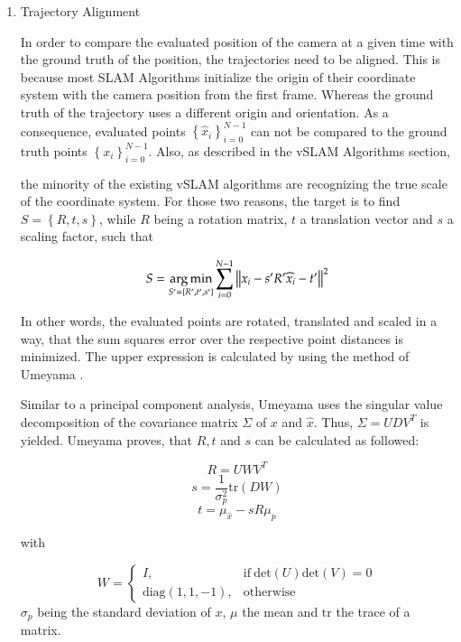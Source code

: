 	\begin{enumerate}
	\item{Trajectory Alignment}\label{umeyamesec}
	
	In order to compare the evaluated position of the camera at a given time with the ground truth of the 
	position, the trajectories need to be aligned. This is because most SLAM Algorithms initialize the origin
	of their coordinate system with the camera position from the first frame. Whereas the ground truth of the 
	trajectory uses a different origin and orientation. As a consequence, evaluated points $ \left\{{\widehat{x}_i}\right\}_{i=0}^{N-1}$ can not be 
	compared to the ground truth points $\left\{{x_i}\right\}_{i=0}^{N-1}$.
	Also, as described in the vSLAM Algorithms section,
	
	
	the minority of the existing vSLAM algorithms are recognizing the true scale of the coordinate system. For
	those two reasons, the target is to find $S = \left\{R,t,s\right\}$, while $R$ being a rotation matrix, $t$ a translation vector
	and $s$ a scaling factor, 
	such that
	
	\begin{equation}
	S = \mathop{\mathrm{arg\,min}}_{S' = \left\{R', t', s' \right\}} \sum_{i = 0}^{N-1} \left\lVert x_i - s'R'\widehat{x}_i - t'\right\rVert^2
	\end{equation}\label{alignmin}
	
	In other words, the evaluated points are rotated, translated and scaled in a way, that the sum squares error over the respective point
	distances is minimized. The upper expression is calculated by using the method of Umeyama \cite{ume}. 
	
	Similar to a principal component analysis, Umeyama uses the singular value decomposition of the covariance 
	matrix $\Sigma$ of $x$ and $\widehat{x}$. Thus, 
	$\Sigma = UDV^T$ is yielded. Umeyama proves, that $R,t$ and $s$ can be calculated as followed: 
	
	$$ R = UWV^T $$
	$$ s = \frac{1}{\sigma^2_p}\text{tr}\left(DW\right)$$
	$$ t = \mu_{\widehat{x}} - sR\mu_p $$
	
	with 
	
	$$ W = \begin{cases}
      I, & \text{if}\ \text{det}\left(U\right)\text{det}\left(V\right) =0 \\
      \text{diag}\left(1,1,-1\right), & \text{otherwise}
    \end{cases}$$
	$\sigma_p$ being the standard deviation of $x$, $\mu$ the mean and $\text{tr}$ the trace of a matrix. 
	

\end{enumerate}
